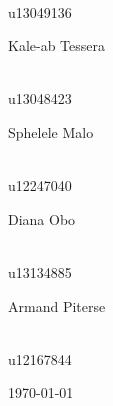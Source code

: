\documentclass[a4paper,12pt]{report}
\begin{document}
\begin{titlepage}
\begin{center}
\begin{minipage}{0.4\textwidth}
\end{minipage}
\begin{minipage}{0.4\textwidth}
\begin{flushright} \large
\emph{} \\
u13049136
\end{flushright}
\end{minipage}
\begin{minipage}{0.4\textwidth}
\begin{flushleft} \large
Kale-ab {Tessera}
\end{flushleft}
\end{minipage}
\begin{minipage}{0.4\textwidth}
\begin{flushright} \large
\emph{} \\
u13048423
\end{flushright}
\end{minipage}
\begin{minipage}{0.4\textwidth}
\begin{flushleft} \large
Sphelele {Malo}
\end{flushleft}
\end{minipage}
\begin{minipage}{0.4\textwidth}
\begin{flushright} \large
\emph{} \\
u12247040
\end{flushright}
\end{minipage}
\begin{minipage}{0.4\textwidth}
\begin{flushleft} \large
Diana {Obo}
\end{flushleft}
\end{minipage}
\begin{minipage}{0.4\textwidth}
\begin{flushright} \large
\emph{} \\
u13134885
\end{flushright}
\end{minipage}
\begin{minipage}{0.4\textwidth}
\begin{flushleft} \large
Armand {Piterse}
\end{flushleft}
\end{minipage}
\begin{minipage}{0.4\textwidth}
\begin{flushright} \large
\emph{} \\
u12167844
\end{flushright}
\end{minipage}
\vfill
{\large \today}
\end{center}
\end{titlepage}
\footnotesize

\normalsize
\end{document}
